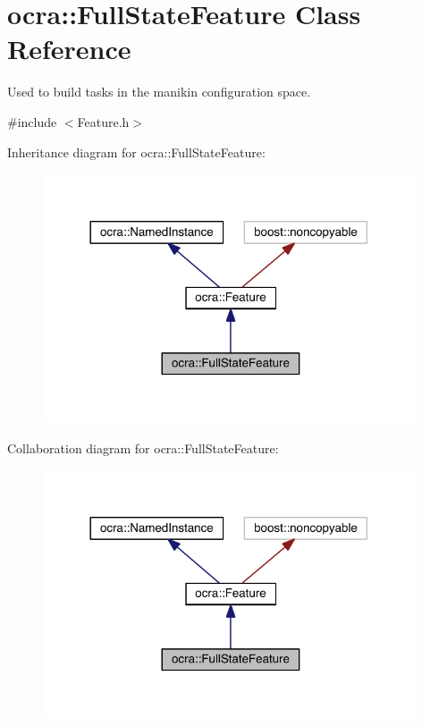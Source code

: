 \hypertarget{classocra_1_1FullStateFeature}{}\section{ocra\+:\+:Full\+State\+Feature Class Reference}
\label{classocra_1_1FullStateFeature}


Used to build tasks in the manikin configuration space.  




{\ttfamily \#include $<$Feature.\+h$>$}



Inheritance diagram for ocra\+:\+:Full\+State\+Feature\+:\nopagebreak
\begin{figure}[H]
\begin{center}
\leavevmode
\includegraphics[width=312pt]{d1/d91/classocra_1_1FullStateFeature__inherit__graph}
\end{center}
\end{figure}


Collaboration diagram for ocra\+:\+:Full\+State\+Feature\+:\nopagebreak
\begin{figure}[H]
\begin{center}
\leavevmode
\includegraphics[width=312pt]{da/d00/classocra_1_1FullStateFeature__coll__graph}
\end{center}
\end{figure}
